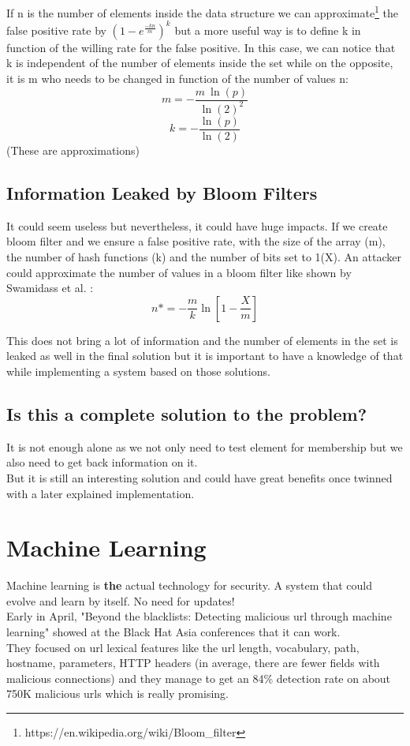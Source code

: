 \documentclass{eplmastersthesis}
\begin{document}
If n is the number of elements inside the data structure we can approximate\footnote{https://en.wikipedia.org/wiki/Bloom\_filter} the false positive rate by $(1-e^{\frac{-kn}{m}})^k$ but a more useful way is to define k in function of the willing rate for the false positive. In this case, we can notice that k is independent of the number of elements inside the set while on the opposite, it is m who needs to be changed in function of the number of values n:
$$m = - \frac{m\ \ln(p)}{\ln(2)^2}$$
$$k = - \frac{\ln(p)}{\ln(2)}$$
(These are approximations)

\subsection{Information Leaked by Bloom Filters}
It could seem useless but nevertheless, it could have huge impacts. If we create bloom filter and we ensure a false positive rate, with the size of the array (m), the number of hash functions (k) and the number of bits set to 1(X). An attacker could approximate the number of values in a bloom filter like shown by Swamidass et al. \cite{swamidass2007mathematical}:
$$n* = - \frac{m}{k} \ln\left[1 - \frac{X}{m}\right] $$

This does not bring a lot of information and the number of elements in the set is leaked as well in the final solution but it is important to have a knowledge of that while implementing a system based on those solutions.

\subsection{Is this a complete solution to the problem?}
It is not enough alone as we not only need to test element for membership but we also need to get back information on it.\\
But it is still an interesting solution and could have great benefits once twinned with a later explained implementation.

\section{Machine Learning}

Machine learning is \textbf{the} actual technology for security. A system that could evolve and learn by itself. No need for updates! \\
Early in April, "Beyond the blacklists: Detecting malicious \gls{url} through machine learning" showed at the Black Hat Asia conferences that it can work.\\
They focused on \gls{url} lexical features like the \gls{url} length, vocabulary, path, hostname, parameters, HTTP headers (in average, there are fewer fields with malicious connections) and they manage to get an 84\% detection rate on about 750K malicious \gls{url}s which is really promising.\\
\end{document}
